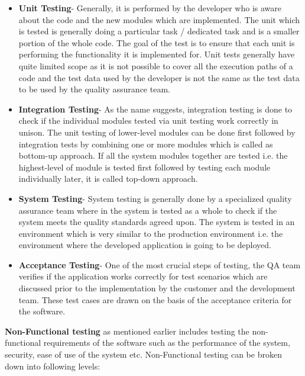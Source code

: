 \begin{itemize}
\item{\textbf{Unit Testing}}- Generally, it is performed by the developer who is aware about the code and the new modules which are implemented. The unit which is tested is generally doing a particular task / dedicated task and is a smaller portion of the whole code. The goal of the test is to ensure that each unit is performing the functionality it is implemented for. Unit tests generally have quite limited scope as it is not possible to cover all the execution paths of a code and the test data used by the developer is not the same as the test data to be used by the quality assurance team. 
\item{\textbf{Integration Testing}}- As the name suggests, integration testing is done to check if the individual modules tested via unit testing work correctly in unison. The unit testing of lower-level modules can be done first followed by integration tests by combining one or more modules which is called as bottom-up approach. If all the system modules together are tested i.e. the highest-level of module is tested first followed by testing each module individually later, it is called top-down approach.
\item{\textbf{System Testing}}- System testing is generally done by a specialized quality assurance team where in the system is tested as a whole to check if the system meets the quality standards agreed upon. The system is tested in an environment which is very similar to the production environment i.e. the environment where the developed application is going to be deployed.
\item{\textbf{Acceptance Testing}}- One of the most crucial steps of testing, the QA team verifies if the application works correctly for test scenarios which are discussed prior to the implementation by the customer and the development team. These test cases are drawn on the basis of the acceptance criteria for the software. 
\end{itemize}        

\textbf{Non-Functional testing} as mentioned earlier includes testing the non-functional requirements of the software such as the performance of the system, security, ease of use of the system etc. Non-Functional testing can be broken down into following levels: 

